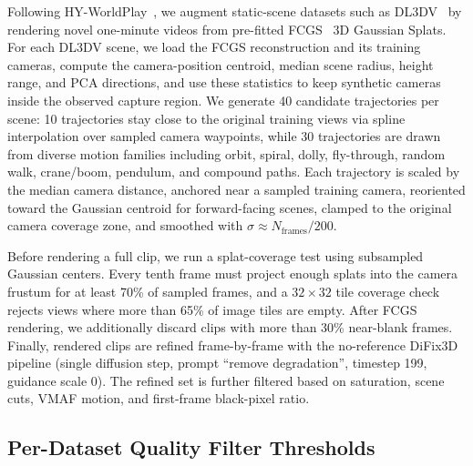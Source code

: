 \documentclass{llmxive}
\begin{document}
Following HY-WorldPlay~\citep{hy_worldplay}, we augment static-scene datasets such as DL3DV~\citep{dl3dv} by rendering novel one-minute videos from pre-fitted FCGS~\citep{fcgs} 3D Gaussian Splats.
For each DL3DV scene, we load the FCGS reconstruction and its training cameras, compute the camera-position centroid, median scene radius, height range, and PCA directions, and use these statistics to keep synthetic cameras inside the observed capture region.
We generate 40 candidate trajectories per scene: 10 trajectories stay close to the original training views via spline interpolation over sampled camera waypoints, while 30 trajectories are drawn from diverse motion families including orbit, spiral, dolly, fly-through, random walk, crane/boom, pendulum, and compound paths.
Each trajectory is scaled by the median camera distance, anchored near a sampled training camera, reoriented toward the Gaussian centroid for forward-facing scenes, clamped to the original camera coverage zone, and smoothed with $\sigma \approx N_\text{frames}/200$.

\noindent Before rendering a full clip, we run a splat-coverage test using subsampled Gaussian centers.
Every tenth frame must project enough splats into the camera frustum for at least 70\% of sampled frames, and a $32{\times}32$ tile coverage check rejects views where more than 65\% of image tiles are empty.
After FCGS rendering, we additionally discard clips with more than 30\% near-blank frames.
Finally, rendered clips are refined frame-by-frame with the no-reference DiFix3D~\citep{difix3d} pipeline (single diffusion step, prompt ``remove degradation'', timestep 199, guidance scale 0).
The refined set is further filtered based on saturation, scene cuts, VMAF motion, and first-frame black-pixel ratio.




\subsection{Per-Dataset Quality Filter Thresholds}
\label{sec:appendix_filters}
\end{document}
